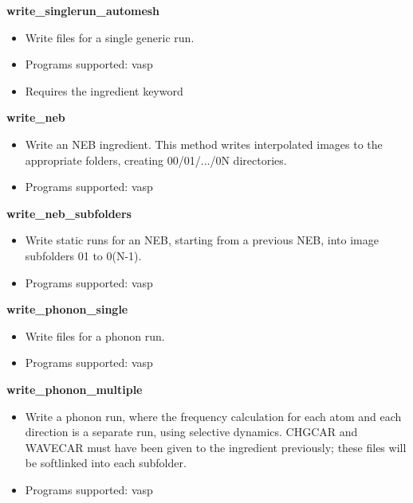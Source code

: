 \documentclass[letterpaper,10pt,english]{sphinxmanual}
\begin{document}
\textbf{write\_singlerun\_automesh}
\begin{itemize}
\item {} 
Write files for a single generic run.

\item {} 
Programs supported: vasp

\item {} 
Requires the  ingredient keyword

\end{itemize}

\textbf{write\_neb}
\begin{itemize}
\item {} 
Write an NEB ingredient. This method writes interpolated images to the appropriate folders, creating 00/01/.../0N directories.

\item {} 
Programs supported: vasp

\end{itemize}

\textbf{write\_neb\_subfolders}
\begin{itemize}
\item {} 
Write static runs for an NEB, starting from a previous NEB, into image subfolders 01 to 0(N-1).

\item {} 
Programs supported: vasp

\end{itemize}

\textbf{write\_phonon\_single}
\begin{itemize}
\item {} 
Write files for a phonon run.

\item {} 
Programs supported: vasp

\end{itemize}

\textbf{write\_phonon\_multiple}
\begin{itemize}
\item {} 
Write a phonon run, where the frequency calculation for each atom and each direction is a separate run, using selective dynamics. CHGCAR and WAVECAR must have been given to the ingredient previously; these files will be softlinked into each subfolder.

\item {} 
Programs supported: vasp

\end{itemize}
\end{document}
